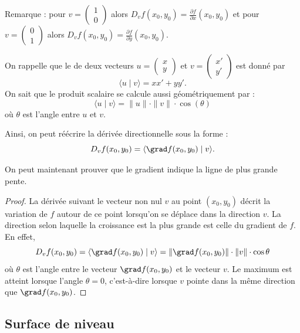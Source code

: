 \documentclass[11pt,class=report,crop=false]{standalone}
\begin{document}
Remarque : pour $v=\left(\begin{smallmatrix}1\\0\end{smallmatrix}\right)$
alors $D_v f(x_0,y_0) = \frac{\partial f}{\partial x}(x_0,y_0)$ et pour 
$v=\left(\begin{smallmatrix}0\\1\end{smallmatrix}\right)$
alors $D_v f(x_0,y_0) = \frac{\partial f}{\partial y}(x_0,y_0)$.


On rappelle que le  de deux vecteurs $u=\left(\begin{smallmatrix}x\\y\end{smallmatrix}\right)$ et 
$v=\left(\begin{smallmatrix}x'\\y'\end{smallmatrix}\right)$
est donné par 
$$\langle u \mid v \rangle = xx' + yy'.$$
On sait que le produit scalaire se calcule aussi géométriquement par :
$$\langle u \mid v \rangle = \|u\|\cdot \|v\| \cdot \cos(\theta)$$
où $\theta$ est l'angle entre $u$ et $v$.



Ainsi, on peut réécrire la dérivée directionnelle sous la forme :
$$D_v f(x_0,y_0) = \langle \grad f (x_0,y_0) \mid v \rangle.$$

 
On peut maintenant prouver que le gradient indique la ligne de plus grande pente.
 
\begin{proof}
La dérivée suivant le vecteur non nul $v$ au point $(x_0,y_0)$ décrit la variation de $f$ autour de ce point lorsqu'on se déplace dans la direction $v$. 
La direction selon laquelle la croissance est la plus grande est celle du gradient de $f$. En effet,
$$D_{v}f(x_0,y_0)=\langle \grad f(x_0,y_0) \mid v\rangle=
\| \grad f(x_0,y_0) \| \cdot \| v \| \cdot \cos \theta$$
où $\theta$ est l'angle entre le vecteur $\grad f(x_0,y_0)$ et le vecteur $v$.
Le maximum est atteint lorsque l'angle $\theta=0$, c'est-à-dire lorsque $v$ pointe dans la même direction que $\grad f(x_0,y_0)$.
\end{proof}


\subsection{Surface de niveau}
\end{document}
